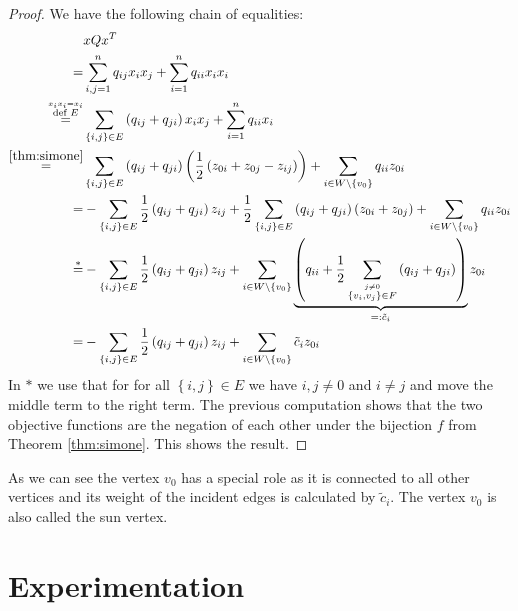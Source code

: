 \documentclass[12pt,a4paper]{article}
\theoremstyle{mythm}
\begin{document}
\begin{proof}
We have the following chain of equalities:
\begin{align*}
&x Q x ^T \\
=& \sum_{ i,j = 1 }^{ n } q _{ ij } x_i x_j + \sum_{ i = 1 }^{ n } q _{ ii } x_i x_{ i } \\
\overset{ \overset{ x_i x_i = x_i  }{ \text{def } E} }{ =}&  \sum_{ \left\{ i,j \right\} \in E  }^{  } \left( q _{ ij } + q _{ ji } \right) x_i x_j + \sum_{ i = 1 }^{ n } q
_{ ii } x_i \\
\overset{ \ref{thm:simone}  }{ =}& \sum_{ \left\{ i,j \right\} \in E  }^{  } \left( q _{ ij } + q _{ ji }  \right) \left( \frac{ 1 }{ 2 } \left( z _{ 0i } + z _{ 0j } - z _{
ij }  \right)  \right) + \sum_{ i \in W \setminus \left\{ v_0 \right\}   }^{  } q _{ ii } z _{ 0i } \\
=& -  \sum_{ \left\{ i,j \right\} \in E  }^{  } \frac{ 1 }{ 2 } \left( q _{ ij } + q _{ ji }  \right) z _{ ij } + 
\frac{ 1 }{ 2 } \sum_{  \left\{ i,j \right\}  \in E }^{ } \left( q _{ ij } +
q _{ ji }  \right) \left(  z _{ 0i } + z _{ 0j } \right) + \sum_{ i \in W \setminus \left\{ v_0 \right\}   }^{  } q _{ ii } z _{ 0i } \\
\overset{ \ast}{ =} & - \sum_{ \left\{ i,j \right\} \in E }^{  } \frac{ 1 }{ 2 } \left( q _{ ij } + q _{ ji }  \right) z _{ ij } + 
\sum_{ i \in W \setminus \left\{ v_0 \right\}   }^{  } \underbrace{ \left( q _{ ii } + \frac{ 1 }{ 2 } \sum_{ \overset{ j \neq 0  }{ \left\{ v_i , v_j \right\} \in F} }^{  }  \left( q _{
ij } + q _{ ji }  \right) \right) }_{ =: \tilde{ c } _i }  z _{ 0i } \\
=& - \sum_{ \left\{ i,j \right\} \in E }^{  } \frac{ 1 }{ 2 } \left( q _{ ij } + q _{ ji }  \right) z _{ ij } + 
\sum_{ i \in W \setminus \left\{ v_0 \right\}   }^{  } \tilde{ c } _i   z _{ 0i } 
\end{align*} 
In $ \ast $ we use that for for all $ \left\{ i,j \right\} \in E $ we have $ i,j \neq 0  $ and $ i \neq j  $ and move the middle term to the right term.
The previous computation shows that the two objective functions are the negation of each other under the bijection $ f $ from Theorem \ref{thm:simone}.
This shows the result.
\end{proof}
As we can see the vertex $ v_0 $ has a special role as it is connected to all other vertices and its weight of the incident edges is calculated by $ \widetilde{ c } _{ i }  $.
The vertex $ v_0 $ is also called the sun vertex.

\newpage
\section{Experimentation}
\label{sec:expermints} 
\end{document}
